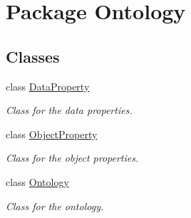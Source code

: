 \hypertarget{namespace_ontology}{
\section{Package Ontology}
\label{namespace_ontology}
}
\subsection*{Classes}
\begin{DoxyCompactItemize}
\item 
class \hyperlink{class_ontology_1_1_data_property}{DataProperty}
\begin{DoxyCompactList}\small\item\em Class for the data properties. \end{DoxyCompactList}\item 
class \hyperlink{class_ontology_1_1_object_property}{ObjectProperty}
\begin{DoxyCompactList}\small\item\em Class for the object properties. \end{DoxyCompactList}\item 
class \hyperlink{class_ontology_1_1_ontology}{Ontology}
\begin{DoxyCompactList}\small\item\em Class for the ontology. \end{DoxyCompactList}\end{DoxyCompactItemize}
